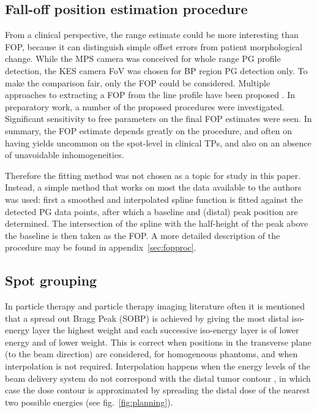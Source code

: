 \documentclass[a4paper,english]{article}
\begin{document}
\subsection{Fall-off position estimation procedure}

From a clinical perspective, the range estimate could be more interesting than FOP, because it can distinguish simple offset errors from patient morphological change. While the MPS camera was conceived for whole range PG profile detection, the KES camera FoV was chosen for BP region PG detection only. To make the comparison fair, only the FOP could be considered. Multiple approaches to extracting a FOP from the line profile have been proposed \citep{Smeets2012,Gueth2013,Roellinghoff2014a,Janssen2014,Sterpin2015}. In preparatory work, a number of the proposed procedures were investigated. Significant sensitivity to free parameters on the final FOP estimates were seen. In summary, the FOP estimate depends greatly on the procedure, and often on having yields uncommon on the spot-level in clinical TPs, and also on an absence of unavoidable inhomogeneities.

Therefore the fitting method was not chosen as a topic for study in this paper. Instead, a simple method that works on most the data available to the authors was used: first a smoothed and interpolated spline function is fitted against the detected PG data points, after which a baseline and (distal) peak position are determined. The intersection of the spline with the half-height of the peak above the baseline is then taken as the FOP. A more detailed description of the procedure may be found in appendix~\ref{sec:fopproc}.

\subsection{Spot grouping}

In particle therapy and particle therapy imaging literature often it is mentioned that a spread out Bragg Peak (SOBP) is achieved by giving the most distal iso-energy layer the highest weight and each successive iso-energy layer is of lower energy and of lower weight. This is correct when positions in the transverse plane (to the beam direction) are considered, for homogeneous phantoms, and when interpolation is not required. Interpolation happens when the energy levels of the beam delivery system do not correspond with the distal tumor contour \citep{0031-9155-57-21-N405}, in which case the dose contour is approximated by spreading the distal dose of the nearest two possible energies (see fig.~\ref{fig:planning}).
\end{document}
